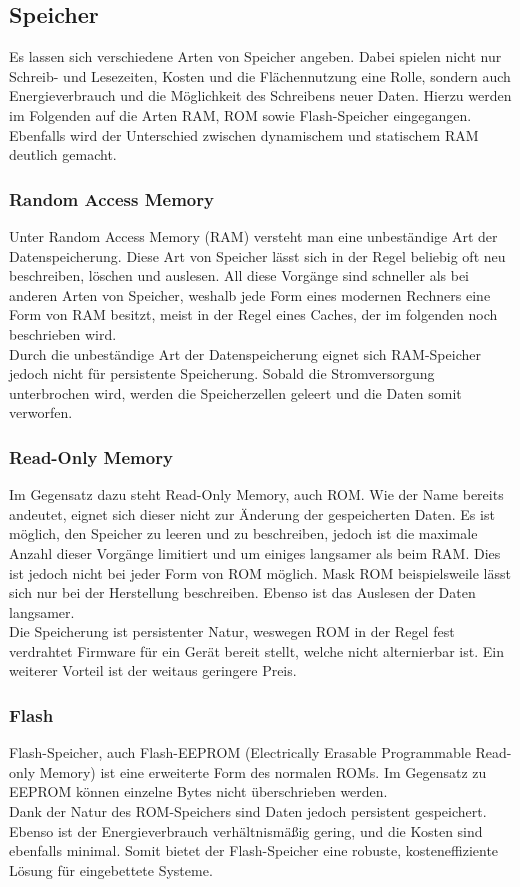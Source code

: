 \subsection{Speicher}\label{2.2}
Es lassen sich verschiedene Arten von Speicher angeben. Dabei spielen nicht nur Schreib- und Lesezeiten, Kosten und die Flächennutzung eine Rolle, sondern auch Energieverbrauch und die Möglichkeit des Schreibens neuer Daten. Hierzu werden im Folgenden auf die Arten RAM, ROM sowie Flash-Speicher eingegangen. Ebenfalls wird der Unterschied zwischen dynamischem und statischem RAM deutlich gemacht.

\subsubsection{Random Access Memory}
Unter Random Access Memory (RAM) versteht man eine unbeständige Art der Datenspeicherung. Diese Art von Speicher lässt sich in der Regel beliebig oft neu beschreiben, löschen und auslesen. All diese Vorgänge sind schneller als bei anderen Arten von Speicher, weshalb jede Form eines modernen Rechners eine Form von RAM besitzt, meist in der Regel eines Caches, der im folgenden noch beschrieben wird.\\
Durch die unbeständige Art der Datenspeicherung eignet sich RAM-Speicher jedoch nicht für persistente Speicherung. Sobald die Stromversorgung unterbrochen wird, werden die Speicherzellen geleert und die Daten somit verworfen.

\subsubsection{Read-Only Memory}
Im Gegensatz dazu steht Read-Only Memory, auch ROM. Wie der Name bereits andeutet, eignet sich dieser nicht zur Änderung der gespeicherten Daten. Es ist möglich, den Speicher zu leeren und zu beschreiben, jedoch ist die maximale Anzahl dieser Vorgänge limitiert und um einiges langsamer als beim RAM. Dies ist jedoch nicht bei jeder Form von ROM möglich. Mask ROM beispielsweile lässt sich nur bei der Herstellung beschreiben. Ebenso ist das Auslesen der Daten langsamer.\\
Die Speicherung ist persistenter Natur, weswegen ROM in der Regel fest verdrahtet Firmware für ein Gerät bereit stellt, welche nicht alternierbar ist. Ein weiterer Vorteil ist der weitaus geringere Preis.

\subsubsection{Flash}
Flash-Speicher, auch Flash-EEPROM (Electrically Erasable Programmable Read-only Memory) ist eine erweiterte Form des normalen ROMs. Im Gegensatz zu EEPROM können einzelne Bytes nicht überschrieben werden.\\
Dank der Natur des ROM-Speichers sind Daten jedoch persistent gespeichert. Ebenso ist der Energieverbrauch verhältnismäßig gering, und die Kosten sind ebenfalls minimal. Somit bietet der Flash-Speicher eine robuste, kosteneffiziente Lösung für eingebettete Systeme.



